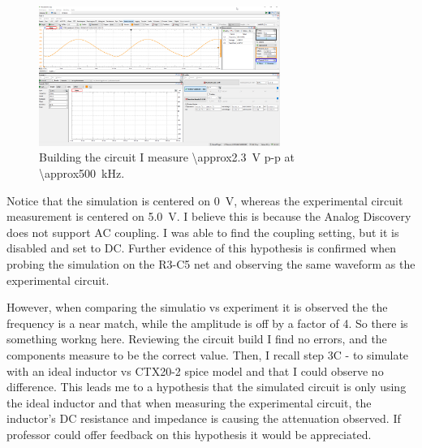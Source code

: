 \documentclass{article}
\begin{document}
	
	\begin{figure}[H]
	    \centering
	    \includegraphics[width=0.7\textwidth]{w2}
	    \caption{Building the circuit I measure \SI{\approx2.3}{\volt} p-p at \SI{\approx500}{\kilo\hertz}.  }
	\end{figure}	
	    
	    Notice that the simulation is centered on \SI{0}{\volt}, whereas the experimental circuit measurement is centered on \SI{5.0}{\volt}. I believe this is because the Analog Discovery does not support AC coupling. I was able to find the coupling setting, but it is disabled and set to DC. Further evidence of this hypothesis is confirmed when probing the simulation on the R3-C5 net and observing the same waveform as the experimental circuit.
	    
	    However, when comparing the simulatio vs experiment it is observed the the frequency is a near match, while the amplitude is off by a factor of 4. So there is something workng here. Reviewing the circuit build I find no errors, and the components measure to be the correct value. Then, I recall step 3C - to simulate with an ideal inductor vs CTX20-2 spice model and that I could observe no difference. This leads me to a hypothesis that the simulated circuit is only using the ideal inductor and that when measuring the experimental circuit, the inductor's DC resistance and impedance is causing the attenuation observed. If professor could offer feedback on this hypothesis it would be appreciated.
	    
	    
	    
	
\end{document}
